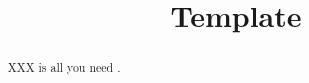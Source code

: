 \documentclass{article}
\title{Template}
\date{}
\begin{document}
\maketitle


\begin{abstract}
    XXX is all you need \citep{VaswaniSPUJGKP17}.
\end{abstract}






\clearpage
\printbibliography

\clearpage

\end{document}
